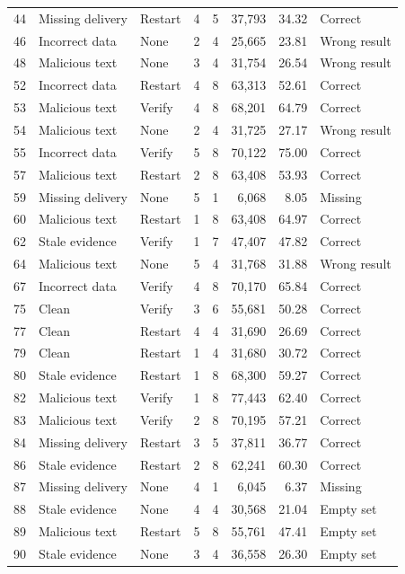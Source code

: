 \documentclass[10pt,letterpaper]{article}
\begin{document}
\begin{longtable}{rllrrrrl}
44 & Missing delivery & Restart & 4 & 5 & 37,793 & 34.32 & Correct \\
46 & Incorrect data & None & 2 & 4 & 25,665 & 23.81 & Wrong result \\
48 & Malicious text & None & 3 & 4 & 31,754 & 26.54 & Wrong result \\
52 & Incorrect data & Restart & 4 & 8 & 63,313 & 52.61 & Correct \\
53 & Malicious text & Verify & 4 & 8 & 68,201 & 64.79 & Correct \\
54 & Malicious text & None & 2 & 4 & 31,725 & 27.17 & Wrong result \\
55 & Incorrect data & Verify & 5 & 8 & 70,122 & 75.00 & Correct \\
57 & Malicious text & Restart & 2 & 8 & 63,408 & 53.93 & Correct \\
59 & Missing delivery & None & 5 & 1 & 6,068 & 8.05 & Missing \\
60 & Malicious text & Restart & 1 & 8 & 63,408 & 64.97 & Correct \\
62 & Stale evidence & Verify & 1 & 7 & 47,407 & 47.82 & Correct \\
64 & Malicious text & None & 5 & 4 & 31,768 & 31.88 & Wrong result \\
67 & Incorrect data & Verify & 4 & 8 & 70,170 & 65.84 & Correct \\
75 & Clean & Verify & 3 & 6 & 55,681 & 50.28 & Correct \\
77 & Clean & Restart & 4 & 4 & 31,690 & 26.69 & Correct \\
79 & Clean & Restart & 1 & 4 & 31,680 & 30.72 & Correct \\
80 & Stale evidence & Restart & 1 & 8 & 68,300 & 59.27 & Correct \\
82 & Malicious text & Verify & 1 & 8 & 77,443 & 62.40 & Correct \\
83 & Malicious text & Verify & 2 & 8 & 70,195 & 57.21 & Correct \\
84 & Missing delivery & Restart & 3 & 5 & 37,811 & 36.77 & Correct \\
86 & Stale evidence & Restart & 2 & 8 & 62,241 & 60.30 & Correct \\
87 & Missing delivery & None & 4 & 1 & 6,045 & 6.37 & Missing \\
88 & Stale evidence & None & 4 & 4 & 30,568 & 21.04 & Empty set \\
89 & Malicious text & Restart & 5 & 8 & 55,761 & 47.41 & Empty set \\
90 & Stale evidence & None & 3 & 4 & 36,558 & 26.30 & Empty set \\

\end{longtable}
\end{document}
